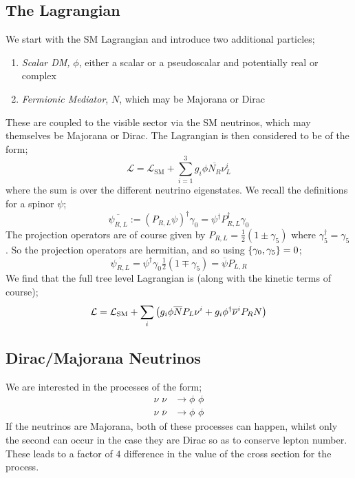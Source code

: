 \documentclass[10pt]{article}
\begin{document}
\subsection{The Lagrangian}
We start with the SM Lagrangian and introduce two additional particles;
\begin{enumerate}
\item \emph{Scalar DM,} $\phi$, either a scalar or a pseudoscalar and potentially real or complex
\item \emph{Fermionic Mediator}, $N$, which may be Majorana or Dirac
\end{enumerate}
These are coupled to the visible sector via the SM neutrinos, which may themselves be Majorana or Dirac. The Lagrangian is then considered to be of the form;
\begin{equation}
\mathcal{L}= \mathcal{L}_{\text{SM}} + \sum_{i = 1}^{3}{g_i \phi \overline{N_R} \nu^i_{L}}
\end{equation}
where the sum is over the different neutrino eigenstates. We recall the definitions for a spinor $\psi$;
\begin{equation*}
\overline{\psi_{R, L}} := (P_{R, L}\psi)^{\dagger}\gamma_0 = \psi^{\dagger}P_{R, L}^{\dagger} \gamma_0
\end{equation*}
The projection operators are of course given by $P_{R, L} = \tfrac{1}{2}(1 \pm \gamma_5)$ where $\gamma_5^{\dagger} = \gamma_5$. So the projection operators are hermitian, and so using $\left\{\gamma_0, \gamma_5\right\} = 0$;
\begin{equation*}
\overline{\psi_{R, L}} = \psi^{\dagger}\gamma_0\tfrac{1}{2}(1 \mp \gamma_5) = \overline{\psi}P_{L, R}
\end{equation*}
We find that the full tree level Lagrangian is (along with the kinetic terms of course);
\begin{equation}
\mathcal{L} = \mathcal{L}_{\text{SM}} + \sum_{i}\left(g_i \phi \overline{N}P_L \nu^{i} + g_{i}\phi^{\dagger} \overline{\nu}^{i}P_R N\right)
\end{equation}
\subsection{Dirac/Majorana Neutrinos}
We are interested in the processes of the form;
\begin{align*}
\nu \,\, \nu &\longrightarrow \phi \,\, \phi \\
\nu \,\, \overline{\nu} &\longrightarrow \phi \,\, \phi
\end{align*}
If the neutrinos are Majorana, both of these processes can happen, whilst only the second can occur in the case they are Dirac so as to conserve lepton number. These leads to a factor of $4$ difference in the value of the cross section for the process.
\end{document}
